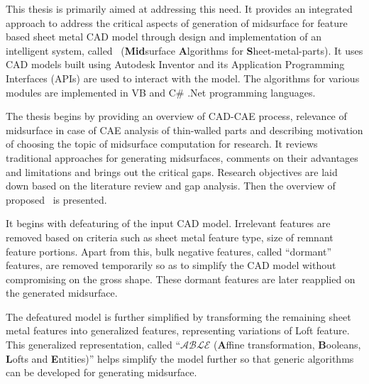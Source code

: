 This thesis is primarily aimed at addressing this need. It provides an integrated approach to address the critical aspects of generation of midsurface for feature based sheet metal CAD model through design and implementation of an intelligent system, called \mysystemname~({\bf Mid}surface {\bf A}lgorithms for {\bf S}heet-metal-parts). It uses CAD models built using Autodesk Inventor and its Application Programming Interfaces (APIs) are used to interact with the model. The algorithms for various modules are implemented in VB and C\# .Net programming languages.
%

The thesis begins by providing an overview of CAD-CAE process, relevance of midsurface in case of CAE analysis of thin-walled parts and describing motivation of choosing the topic of midsurface computation for research. It reviews traditional approaches for generating midsurfaces, comments on their advantages and limitations and brings out the critical gaps. Research objectives are laid down based on the literature review and gap analysis. Then the overview of proposed \mysystemname~is presented. 

It begins with defeaturing of the input CAD model. Irrelevant features are removed based on criteria such as sheet metal feature type, size of remnant feature portions. Apart from this, bulk negative features, called ``dormant'' features, are removed temporarily so as to simplify the CAD model without compromising on the gross shape. These dormant features are later reapplied on the generated midsurface. 

The defeatured model is further simplified by transforming the remaining sheet metal features into generalized features, representing variations of Loft feature. This generalized representation, called ``$\mathcal{ABLE}$ ({\bf A}ffine transformation, {\bf B}ooleans,  {\bf L}ofts and {\bf E}ntities)'' helps simplify the model further so that generic algorithms can be developed for generating midsurface. 

